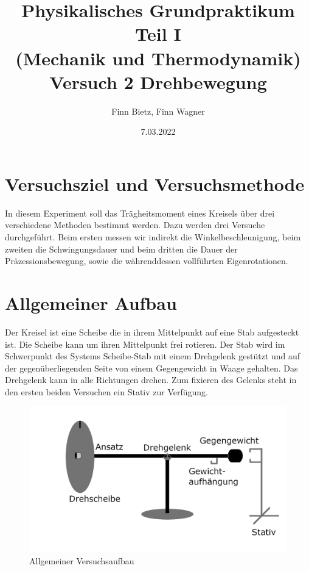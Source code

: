 \documentclass{article}
\date{7.03.2022}
\title{Physikalisches Grundpraktikum Teil I \\ (Mechanik und Thermodynamik) \\ Versuch 2 Drehbewegung}
\author{Finn Bietz, Finn Wagner}
\begin{document}
	
	\maketitle

	\section{Versuchsziel und Versuchsmethode}
		In diesem Experiment soll das Trägheitsmoment eines Kreisels über drei verschiedene Methoden bestimmt werden.
		Dazu werden drei Versuche durchgeführt. Beim ersten messen wir indirekt die Winkelbeschleunigung, beim zweiten die Schwingungsdauer
		und beim dritten die Dauer der Präzessionsbewegung, sowie die währenddessen vollführten Eigenrotationen.
			
	\section{Allgemeiner Aufbau}
		Der Kreisel ist eine Scheibe die in ihrem Mittelpunkt auf eine Stab aufgesteckt ist. Die Scheibe kann um ihren Mittelpunkt frei rotieren.
		Der Stab wird im Schwerpunkt des Systems Scheibe-Stab mit einem Drehgelenk gestützt und auf der gegenüberliegenden Seite von einem Gegengewicht in Waage gehalten.
		Das Drehgelenk kann in alle Richtungen drehen. Zum fixieren des Gelenks steht in den ersten beiden Versuchen ein Stativ zur Verfügung.
		\begin{figure}[!ht]\label{fig:aufbau}
			\centering
			\includegraphics[width=\textwidth]{aufbau.png}
			\caption{Allgemeiner Versuchsaufbau}
		\end{figure}
\end{document}
